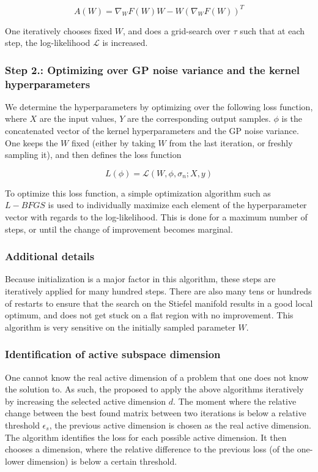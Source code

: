 \documentclass[a4paper,12pt,twoside,openright]{report}
\begin{document}
\begin{equation}
A(W) = \nabla_{W} F(W) W - W ( \nabla_{W} F(W) )^T
\end{equation}

One iteratively chooses fixed $W$, and does a grid-search over $\tau$ such that at each step, the log-likelihood $\mathcal{L}$ is increased.

\subsubsection{Step 2.: Optimizing over GP noise variance and the kernel hyperparameters}

We determine the hyperparameters by optimizing over the following loss function, where $X$ are the input values, $Y$ are the corresponding output samples. $\phi$ is the concatenated vector of the kernel hyperparameters and the GP noise variance. \\

One keeps the $W$ fixed (either by taking $W$ from the last iteration, or freshly sampling it), and then defines the loss function

\begin{equation}
	L(\phi) = \mathcal{L}(W, \phi, \sigma_n; X, y) 
\end{equation}

To optimize this loss function, a simple optimization algorithm such as $L-BFGS$ is used to individually maximize each element of the hyperparameter vector with regards to the log-likelihood.
This is done for a maximum number of steps, or until the change of improvement becomes marginal. \\

\subsubsection{Additional details}
Because initialization is a major factor in this algorithm, these steps are iteratively applied for many hundred steps.
There are also many tens or hundreds of restarts to ensure that the search on the Stiefel manifold results in a good local optimum, and does not get stuck on a flat region with no improvement.
This algorithm is very sensitive on the initially sampled parameter $W$.

\subsubsection{Identification of active subspace dimension }
One cannot know the real active dimension of a problem that one does not know the solution to.
As such, the proposed to apply the above algorithms iteratively by increasing the selected active dimension $d$.
The moment where the relative change between the best found matrix between two iterations is below a relative threshold $\epsilon_s$, the previous active dimension is chosen as the real active dimension. 
The algorithm identifies the loss for each possible active dimension.
It then chooses a dimension, where the relative difference to the previous loss (of the one-lower dimension) is below a certain threshold.
\end{document}
